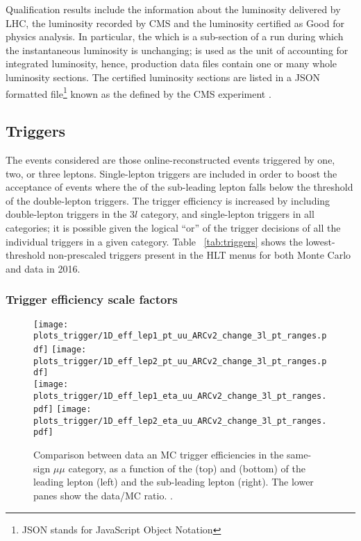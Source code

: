 Qualification results include the information about the luminosity delivered by LHC, the luminosity recorded by CMS and the luminosity certified as Good for physics analysis. In particular, the  which is a sub-section of a run during which the instantaneous luminosity is unchanging; is used as the unit of accounting for integrated luminosity, hence, production data files contain one or many whole luminosity sections. The certified luminosity sections are listed in a JSON formatted file\footnote{JSON stands for JavaScript Object Notation} known as the  defined by the CMS experiment \cite{json}.

\subsection{Triggers}

The events considered are those online-reconstructed events triggered by one, two, or three leptons. Single-lepton triggers are included in order to boost the acceptance of events where the \pt of the sub-leading lepton falls below the threshold of the double-lepton triggers. The trigger efficiency is increased by including double-lepton triggers in the $3l$ category, and single-lepton triggers in all categories; it is possible given the logical ``or'' of the trigger decisions of all the individual triggers in a given category. Table ~\ref{tab:triggers} shows the lowest-threshold non-prescaled triggers present in the HLT menus for both Monte Carlo and data in 2016.

\subsubsection*{Trigger efficiency scale factors}

\begin{figure}[htp]
\centering
\texttt{[image: plots\_trigger/1D\_eff\_lep1\_pt\_uu\_ARCv2\_change\_3l\_pt\_ranges.pdf]}
\texttt{[image: plots\_trigger/1D\_eff\_lep2\_pt\_uu\_ARCv2\_change\_3l\_pt\_ranges.pdf]} \\
\texttt{[image: plots\_trigger/1D\_eff\_lep1\_eta\_uu\_ARCv2\_change\_3l\_pt\_ranges.pdf]}
\texttt{[image: plots\_trigger/1D\_eff\_lep2\_eta\_uu\_ARCv2\_change\_3l\_pt\_ranges.pdf]}
\caption[Trigger efficiency for the same-sign $\mu\mu$ category]{Comparison between data an MC trigger efficiencies in the same-sign $\mu\mu$ category, as a function of the \pt (top) and \etac (bottom) of the leading lepton (left) and the sub-leading lepton (right). The lower panes show the data/MC ratio. \cite{CMS_AN_2017-029}.}
\label{fig:trigeffsmumu}
\end{figure}

